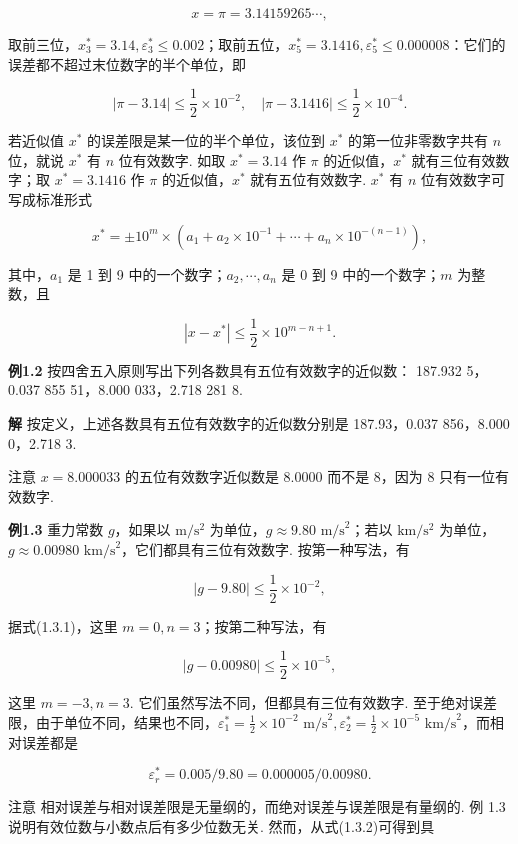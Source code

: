\documentclass[
  10pt,
  fontset=fandol]{ctexart}
\begin{document}
\[
x = \pi = 3.14159265\cdots,
\]

取前三位，\(x_3^* = 3.14, \varepsilon_3^* \leqslant 0.002\)；取前五位，\(x_5^* = 3.1416, \varepsilon_5^* \leqslant 0.000008\)：它们的误差都不超过末位数字的半个单位，即

\[
|\pi - 3.14| \leqslant \frac{1}{2} \times 10^{-2}, \quad |\pi - 3.1416| \leqslant \frac{1}{2} \times 10^{-4}.
\]

若近似值 \(x^*\) 的误差限是某一位的半个单位，该位到 \(x^*\) 的第一位非零数字共有 \(n\) 位，就说 \(x^*\) 有 \(n\) 位有效数字. 如取 \(x^* = 3.14\) 作 \(\pi\) 的近似值，\(x^*\) 就有三位有效数字；取 \(x^* = 3.1416\) 作 \(\pi\) 的近似值，\(x^*\) 就有五位有效数字. \(x^*\) 有 \(n\) 位有效数字可写成标准形式

\[
x^* = \pm 10^m \times (a_1 + a_2 \times 10^{-1} + \cdots + a_n \times 10^{-(n-1)}), \tag{1.3.1}
\]

其中，\(a_1\) 是 1 到 9 中的一个数字；\(a_2, \cdots, a_n\) 是 0 到 9 中的一个数字；\(m\) 为整数，且

\[
|x - x^*| \leqslant \frac{1}{2} \times 10^{m-n+1}. \tag{1.3.2}
\]

\textbf{例1.2} 按四舍五入原则写出下列各数具有五位有效数字的近似数： 187.932 5，0.037 855 51，8.000 033，2.718 281 8.

\textbf{解} 按定义，上述各数具有五位有效数字的近似数分别是 187.93，0.037 856，8.000 0，2.718 3.

注意 \(x = 8.000033\) 的五位有效数字近似数是 8.0000 而不是 8，因为 8 只有一位有效数字.

\textbf{例1.3} 重力常数 \(g\)，如果以 \(\mathrm{m/s^2}\) 为单位，\(g \approx 9.80 \text{ m/s}^2\)；若以 \(\mathrm{km/s^2}\) 为单位，\(g \approx 0.00980 \text{ km/s}^2\)，它们都具有三位有效数字. 按第一种写法，有

\[
|g - 9.80| \leqslant \frac{1}{2} \times 10^{-2},
\]

据式(1.3.1)，这里 \(m=0, n=3\)；按第二种写法，有

\[
|g - 0.00980| \leqslant \frac{1}{2} \times 10^{-5},
\]

这里 \(m=-3, n=3\). 它们虽然写法不同，但都具有三位有效数字. 至于绝对误差限，由于单位不同，结果也不同，\(\varepsilon_1^* = \frac{1}{2} \times 10^{-2} \text{ m/s}^2,\allowbreak  \varepsilon_2^* = \frac{1}{2} \times 10^{-5} \text{ km/s}^2\)，而相对误差都是

\[
\varepsilon_r^* = 0.005/9.80 = 0.000005/0.00980.
\]

注意 相对误差与相对误差限是无量纲的，而绝对误差与误差限是有量纲的. 例 1.3 说明有效位数与小数点后有多少位数无关. 然而，从式(1.3.2)可得到具
\end{document}

